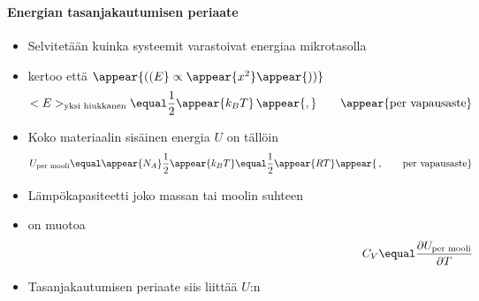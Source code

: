 \begin{frame}%
\frametitle{\texorpdfstring{\culine[\sectiontitleulinecolor]{\sectiontitle}}{\sectiontitle} }
\framesubtitle{Energian tasanjakautumisen periaate}
\appear{}

\begin{itemize}[itemsep=1.6mm]
	\item Selvitetään kuinka systeemit varastoivat energiaa mikrotasolla %
	\item {} kertoo että     $\appear{\textrm{((} E} \propto \appear{x^{2}} \appear{\textrm{))}} $ \appear{:}\vspace{-0.5mm}
\[
<E>_{\text{yksi hiukkanen}}  \equal \frac{1}{2} \appear{k_{B} T} \,\appear{,} \qquad \appear{\textrm{per~vapausaste}}
\] 
\vspace{-0.5mm}
\item Koko materiaalin sisäinen energia $U$ on tällöin
\vspace{-0.5mm}
\[
U_{\text{per mooli}}  \equal \appear{N_{A}} \frac{1}{2} \appear{k_{B} T} \equal \frac{1}{2} \appear{R T} \appear{\,, \qquad \textrm{per~vapausaste}}
\]
\vspace{-0.5mm}
\item Lämpökapasiteetti  joko massan tai moolin suhteen

\item {}  on muotoa \vspace{-10.5mm}
\[
\hspace{10.0cm} C_{V}  \equal \frac{\partial U_{\text {per mooli}}}{\partial T}
\]
\vspace{-1.0mm}
\item Tasanjakautumisen periaate siis liittää $U$:n  
\end{itemize}

\endofslide 
\end{frame}

